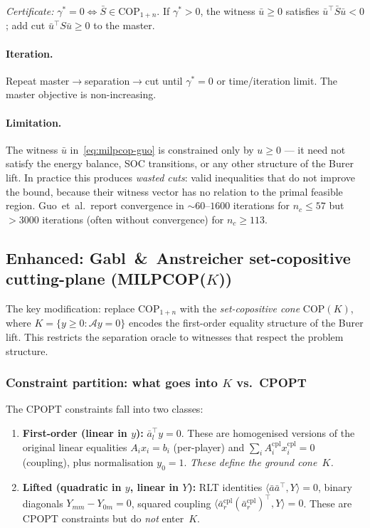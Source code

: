 \documentclass[11pt]{article}
\theoremstyle{definition}
\newcommand{\inner}[2]{\langle #1, #2 \rangle}
\newcommand{\xcom}{x^{\mathrm{cpl}}}
\newcommand{\Acom}{A^{\mathrm{cpl}}}
\begin{document}
\emph{Certificate:} $\gamma^{*}=0\Leftrightarrow\bar S\in
\mathrm{COP}_{1+n}$.  If $\gamma^{*}>0$, the witness $\bar u\ge0$
satisfies $\bar u^{\top}\bar S\bar u<0$; add cut
$\bar u^{\top}S\bar u\ge0$ to the master.

\paragraph{Iteration.}
Repeat master$\to$separation$\to$cut until $\gamma^{*}=0$ or
time/iteration limit.  The master objective is non-increasing.

\paragraph{Limitation.}
The witness $\bar u$ in~\eqref{eq:milpcop-guo} is constrained only by
$u\ge0$ --- it need not satisfy the energy balance, SOC transitions, or
any other structure of the Burer lift.  In practice this produces
\emph{wasted cuts}: valid inequalities that do not improve the bound,
because their witness vector has no relation to the primal feasible
region.  Guo~et~al.\ report convergence in $\sim\!60$--$1600$
iterations for $n_c\le57$ but $>3000$ iterations (often without
convergence) for $n_c\ge113$.

\subsection{Enhanced: Gabl~\&~Anstreicher set-copositive cutting-plane
(MILPCOP($K$))}
\label{sec:ga}

The key modification: replace $\mathrm{COP}_{1+n}$ with the
\emph{set-copositive cone} $\mathrm{COP}(K)$, where
$K=\{y\ge0:\mathcal{A}y=0\}$ encodes the first-order equality
structure of the Burer lift.  This restricts the separation oracle to
witnesses that respect the problem structure.

\subsubsection{Constraint partition: what goes into $K$ vs.\ CPOPT}
\label{sec:partition}

The CPOPT constraints fall into two classes:
\begin{enumerate}[label=\textbf{(\Alph*)},leftmargin=2.4em]
\item \textbf{First-order (linear in $y$):}  $\bar a_l^{\top}y=0$.
  These are homogenised versions of the original linear equalities
  $A_ix_i=b_i$ (per-player) and
  $\sum_i\Acom_i\xcom_i=0$ (coupling), plus normalisation $y_0=1$.
  \emph{These define the ground cone~$K$.}
\item \textbf{Lifted (quadratic in $y$, linear in $Y$):}
  RLT identities $\inner{\bar a\bar a^{\top}}{Y}=0$, binary diagonals
  $Y_{mm}-Y_{0m}=0$, squared coupling
  $\inner{\bar a^{\mathrm{cpl}}_r(\bar a^{\mathrm{cpl}}_r)^{\top}}{Y}=0$.
  These are CPOPT constraints but do \emph{not} enter~$K$.
\end{enumerate}
\end{document}
